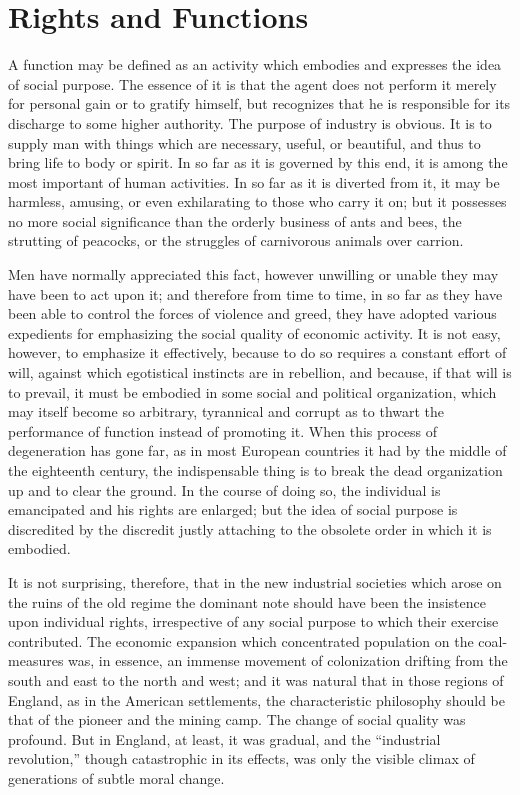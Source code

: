 \documentclass{book}
\begin{document}
\chapter{Rights and Functions}
\label{chapter-1}
A function may be defined as an activity which embodies and expresses the idea of social purpose. The essence of it is that the agent does not perform it merely for personal gain or to gratify himself, but recognizes that he is responsible for its discharge to some higher authority. The purpose of industry is obvious. It is to supply man with things which are necessary, useful, or beautiful, and thus to bring life to body or spirit. In so far as it is governed by this end, it is among the most important of human activities. In so far as it is diverted from it, it may be harmless, amusing, or even exhilarating to those who carry it on; but it possesses no more social significance than the orderly business of ants and bees, the strutting of peacocks, or the struggles of carnivorous animals over carrion.

Men have normally appreciated this fact, however unwilling or unable they may have been to act upon it; and therefore from time to time, in so far as they have been able to control the forces of violence and greed, they have adopted various expedients for emphasizing the social quality of economic activity. It is not easy, however, to emphasize it effectively, because to do so requires a constant effort of will, against which egotistical instincts are in rebellion, and because, if that will is to prevail, it must be embodied in some social and political organization, which may itself become so arbitrary, tyrannical and corrupt as to thwart the performance of function instead of promoting it. When this process of degeneration has gone far, as in most European countries it had by the middle of the eighteenth century, the indispensable thing is to break the dead organization up and to clear the ground. In the course of doing so, the individual is emancipated and his rights are enlarged; but the idea of social purpose is discredited by the discredit justly attaching to the obsolete order in which it is embodied.

It is not surprising, therefore, that in the new industrial societies which arose on the ruins of the old regime the dominant note should have been the insistence upon individual rights, irrespective of any social purpose to which their exercise contributed. The economic expansion which concentrated population on the coal-measures was, in essence, an immense movement of colonization drifting from the south and east to the north and west; and it was natural that in those regions of England, as in the American settlements, the characteristic philosophy should be that of the pioneer and the mining camp. The change of social quality was profound. But in England, at least, it was gradual, and the “industrial revolution,” though catastrophic in its effects, was only the visible climax of generations of subtle moral change.
\end{document}
